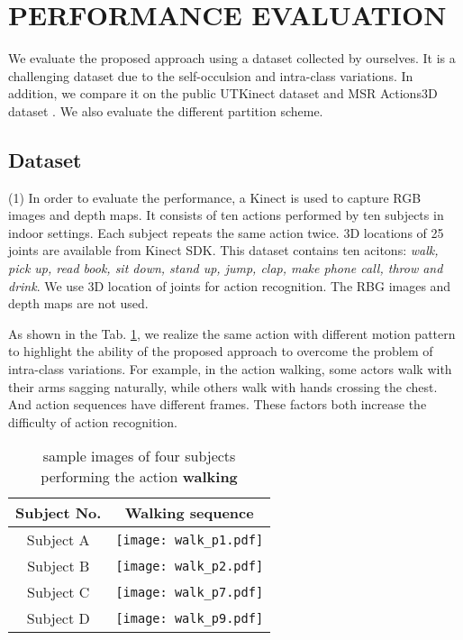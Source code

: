 \documentclass[conference]{IEEEtran}
\begin{document}
\section{PERFORMANCE EVALUATION}
\label{sec:EXPERIMENTAL EVALUATION}
	We evaluate the proposed approach using a dataset collected by ourselves. It is a challenging dataset due to the self-occulsion and intra-class variations.
	In addition, we compare it on the public UTKinect \cite{hostogram_of_3d_joints} dataset and MSR Actions3D dataset \cite{MSR3D_dataset}.
	We also evaluate the different partition scheme.
	\subsection{Dataset}
		(1) In order to evaluate the performance, a Kinect is used to capture RGB images and depth maps. It consists of ten actions performed by ten subjects in indoor settings. Each subject repeats the same action twice. 3D locations of 25 joints are available from Kinect SDK. This dataset contains ten acitons: \textit{walk, pick up, read book, sit down, stand up, jump, clap, make phone call, throw and drink}. We use 3D location of joints for action recognition. The RBG images and depth maps are not used.
		
		As shown in the Tab. \ref{tab:walk}, we realize the same action with different motion pattern to highlight the ability of the proposed approach to overcome the problem of intra-class variations.
		For example, in the action walking, some actors walk with their arms sagging naturally, while others walk with hands crossing the chest.
		And action sequences have different frames.
		These factors both increase the difficulty of action recognition.
		\begin{table}[htbp]
			\caption{sample images of four subjects performing the action \textbf{walking}}
			\label{tab:walk}
			\begin{center}
				\begin{tabular}{|c|c|} \hline
					Subject No. & Walking sequence \\\hline
					Subject A & \parbox[c]{2.4in}{\texttt{[image: walk\_p1.pdf]}} \\\hline
					Subject B & \parbox[c]{2.4in}{\texttt{[image: walk\_p2.pdf]}} \\\hline
					Subject C & \parbox[c]{2.4in}{\texttt{[image: walk\_p7.pdf]}} \\\hline
					Subject D & \parbox[c]{2.4in}{\texttt{[image: walk\_p9.pdf]}} \\\hline
				\end{tabular}
			\end{center}
		\end{table}
		
\end{document}
